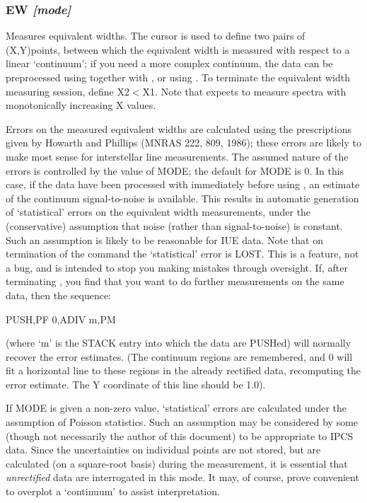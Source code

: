 \documentclass[twoside,11pt,noabs,nolof]{starlink}
\providecommand{\dipcom}[3]{\subsubsection*{\label{COM:#1}\textbf{#1} \emph{#2}}}
\begin{document}
\dipcom{EW}{[mode]}{Measures equivalent widths}
Measures equivalent widths. The cursor is used to define two pairs of
(X,Y)points, between which the equivalent width is measured with
respect to a linear `continuum'; if you need a more complex continuum,
the data can be preprocessed using   together with ,  or using
.  To terminate the equivalent width measuring session, define
X2$<$X1. Note that   expects to measure spectra with monotonically
increasing X values.

Errors on the measured equivalent widths are calculated using the
prescriptions given by Howarth and Phillips (MNRAS 222, 809, 1986);
these errors are likely to make most sense for interstellar line
measurements. The assumed nature of the errors is controlled by the
value of MODE; the default for MODE is 0. In this case, if the data
have been processed with   immediately before using ,  an estimate
of the continuum signal-to-noise is available. This results in
automatic generation of `statistical' errors on the equivalent width
measurements, under the (conservative) assumption that noise (rather
than signal-to-noise) is constant. Such an assumption is likely to be
reasonable for IUE data. Note that on termination of the   command
the `statistical' error is LOST. This is a feature, not a bug, and is
intended to stop you making mistakes through oversight. If, after
terminating ,  you find that you want to do further measurements on
the same data, then the sequence:

\begin{terminalv}
PUSH,PF 0,ADIV m,PM
\end{terminalv}

(where `m' is the STACK entry into which the data are PUSHed) will
normally recover the error estimates. (The   continuum regions are
remembered, and   0 will fit a horizontal line to these regions in
the already rectified data, recomputing the error estimate. The Y
coordinate of this line should be 1.0).

If MODE is given a non-zero value, `statistical' errors are calculated
under the assumption of Poisson statistics. Such an assumption may be
considered by some (though not necessarily the author of this
document) to be appropriate to IPCS data. Since the uncertainties on
individual points are not stored, but are calculated (on a square-root
basis) during the   measurement, it is essential that \emph{unrectified} data are interrogated in this mode. It may, of course,
prove convenient to overplot a `continuum' to assist interpretation.
\end{document}
